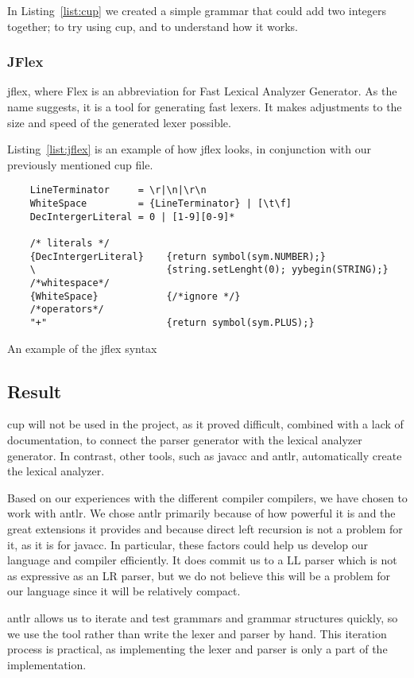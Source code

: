 In Listing~\ref{list:cup} we created a simple grammar that could add two integers together; to try using \gls{cup}, and to understand how it works.


\subsubsection{JFlex}
\gls{jflex}, where Flex is an abbreviation for Fast Lexical Analyzer Generator. As the name suggests, it is a tool for generating fast lexers. It makes adjustments to the size and speed of the generated lexer possible.

Listing~\ref{list:jflex} is an example of how \gls{jflex} looks, in conjunction with our previously mentioned \gls{cup} file.


\begin{listing}[htb!]
  \centering
  \begin{verbatim}
    LineTerminator     = \r|\n|\r\n
    WhiteSpace         = {LineTerminator} | [\t\f]
    DecIntergerLiteral = 0 | [1-9][0-9]*

    /* literals */
    {DecIntergerLiteral}    {return symbol(sym.NUMBER);}
    \                       {string.setLenght(0); yybegin(STRING);}
    /*whitespace*/ 
    {WhiteSpace}            {/*ignore */}  
    /*operators*/
    "+"                     {return symbol(sym.PLUS);}
  \end{verbatim}
  \caption{An example of the \gls{jflex} syntax}
  \label{list:jflex}
\end{listing}


\subsection{Result}
\gls{cup} will not be used in the project, as it proved difficult, combined with a lack of documentation, to connect the parser generator with the lexical analyzer generator. In contrast, other tools, such as \gls{javacc} and \gls{antlr}, automatically create the lexical analyzer.

Based on our experiences with the different compiler compilers, we have chosen to work with \gls{antlr}. We chose \gls{antlr} primarily because of how powerful it is and the great extensions it provides and because direct left recursion is not a problem for it, as it is for \gls{javacc}. In particular, these factors could help us develop our language and compiler efficiently. It does commit us to a LL parser which is not as expressive as an LR parser, but we do not believe this will be a problem for our language since it will be relatively compact.

\gls{antlr} allows us to iterate and test grammars and grammar structures quickly, so we use the tool rather than write the lexer and parser by hand. This iteration process is practical, as implementing the lexer and parser is only a part of the implementation.